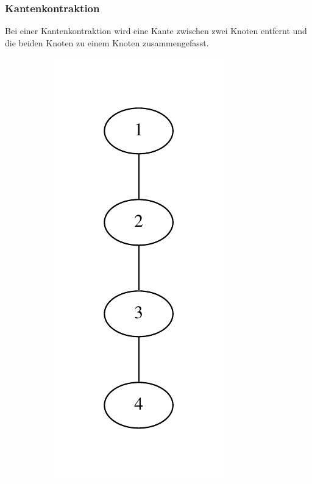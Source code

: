 \documentclass{scrartcl}
\begin{document}
\subsubsection{Kantenkontraktion}

Bei einer Kantenkontraktion wird eine Kante zwischen zwei Knoten entfernt und 
die beiden Knoten zu einem Knoten zusammengefasst.

\begin{figure}[h!!!]
\centering
\begin{subfigure}{.5\textwidth}
	\centering
	\includegraphics{kontrakt.pdf}
\end{subfigure}%
\begin{subfigure}{.5\textwidth}
	\centering

\end{subfigure}
\end{figure}
\end{document}
